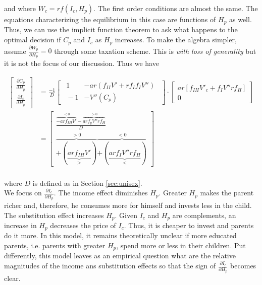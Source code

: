 \noindent and where $W_{c} = r f(I_{c}, H_{p})$. The first order conditions are almost the same. The equations characterizing the equilibrium in this case are functions of $H_{p}$ as well. Thus, we can use the implicit function theorem to ask what happens to the optimal decision if $C_{p}$ and $I_{c}$ as $H_{p}$ increases. To make the algebra simpler, assume $\frac{\partial W_{p}}{\partial H_{p}} = 0$ through some taxation scheme. This is \textit{with loss of generality} but it is not the focus of our discussion. Thus we have

\begin{align*}
\begin{bmatrix}
\frac{\partial C_p}{dH_p} \\
\frac{\partial I_c}{dH_p}
\end{bmatrix} &= \frac{-1}{D} \begin{bmatrix}
                                \ \ 1 & - a r (f_{II} V' + r f_I f_I V'')\ \ \\
                                \ \ -1 & -V''(C_p)\ \
                             \end{bmatrix} \cdot \begin{bmatrix}
                                                    a r [f_{IH} V'_c + f_I V'' r f_H] \\
                                                    0
                                                 \end{bmatrix} \\
              &= \begin{bmatrix}
                    \frac{\overbrace{-a r f_{IH} V'}^{ < 0} - \overbrace{a r f_y V'' r f_H}^{> 0}}{D} \\
                    \overbrace{+ (\underbrace{a r f_{IH} V'}_{>})}^{> 0} \overbrace{+ (\underbrace{a r f_I V'' r f_H}_{<})}^{< 0}
                 \end{bmatrix} \\
\end{align*}


\noindent where $D$ is defined as in  Section \ref{sec:unisex}.\\
\indent We focus on $\frac{\partial I_{c}}{\partial H_{p}}$. The income effect diminishes $H_{p}$. Greater $H_{p}$ makes the parent richer and, therefore, he consumes more for himself and invests less in the child. The substitution effect increases $H_{p}$. Given $I_{c}$ and $H_{p}$ are complements, an increase in $H_{p}$ decreases the price of $I_{c}$. Thus, it is cheaper to invest and parents do it more. In this model, it remains theoretically unclear if more educated parents, i.e. parents with greater $H_{p}$, spend more or less in their children. Put differently, this model leaves as an empirical question what are the relative magnitudes of the income ans substitution effects so that the sign of $\frac{\partial I_{c}}{\partial H_{p}}$ becomes clear.\\

